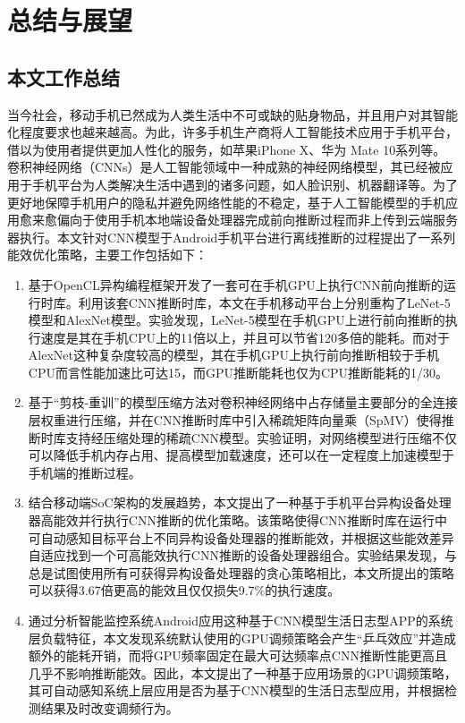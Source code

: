 \chapter{总结与展望}

\section{本文工作总结}
当今社会，移动手机已然成为人类生活中不可或缺的贴身物品，并且用户对其智能化程度要求也越来越高。为此，许多手机生产商将人工智能技术应用于手机平台，借以为使用者提供更加人性化的服务，如苹果iPhone X、华为 Mate 10系列等。卷积神经网络（CNNs）是人工智能领域中一种成熟的神经网络模型，其已经被应用于手机平台为人类解决生活中遇到的诸多问题，如人脸识别、机器翻译等。为了更好地保障手机用户的隐私并避免网络性能的不稳定，基于人工智能模型的手机应用愈来愈偏向于使用手机本地端设备处理器完成前向推断过程而非上传到云端服务器执行。本文针对CNN模型于Android手机平台进行离线推断的过程提出了一系列能效优化策略，主要工作包括如下：
\begin{enumerate}
  \item 基于OpenCL异构编程框架开发了一套可在手机GPU上执行CNN前向推断的运行时库。利用该套CNN推断时库，本文在手机移动平台上分别重构了LeNet-5模型和AlexNet模型。实验发现，LeNet-5模型在手机GPU上进行前向推断的执行速度是其在手机CPU上的11倍以上，并且可以节省120多倍的能耗。而对于AlexNet这种复杂度较高的模型，其在手机GPU上执行前向推断相较于手机CPU而言性能加速比可达15，而GPU推断能耗也仅为CPU推断能耗的1/30。
  \item 基于“剪枝-重训”的模型压缩方法对卷积神经网络中占存储量主要部分的全连接层权重进行压缩，并在CNN推断时库中引入稀疏矩阵向量乘（SpMV）使得推断时库支持经压缩处理的稀疏CNN模型。实验证明，对网络模型进行压缩不仅可以降低手机内存占用、提高模型加载速度，还可以在一定程度上加速模型于手机端的推断过程。
  \item 结合移动端SoC架构的发展趋势，本文提出了一种基于手机平台异构设备处理器高能效并行执行CNN推断的优化策略。该策略使得CNN推断时库在运行中可自动感知目标平台上不同异构设备处理器的推断能效，并根据这些能效差异自适应找到一个可高能效执行CNN推断的设备处理器组合。实验结果发现，与总是试图使用所有可获得异构设备处理器的贪心策略相比，本文所提出的策略可以获得3.67倍更高的能效且仅仅损失9.7\%的执行速度。
  \item 通过分析智能监控系统Android应用这种基于CNN模型生活日志型APP的系统层负载特征，本文发现系统默认使用的GPU调频策略会产生“乒乓效应”并造成额外的能耗开销，而将GPU频率固定在最大可达频率点CNN推断性能更高且几乎不影响推断能效。因此，本文提出了一种基于应用场景的GPU调频策略，其可自动感知系统上层应用是否为基于CNN模型的生活日志型应用，并根据检测结果及时改变调频行为。
\end{enumerate}


